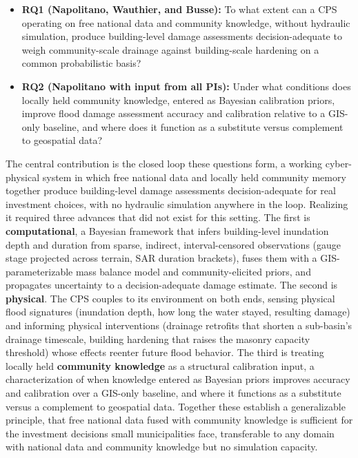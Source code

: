 \documentclass[11pt]{article}
\begin{document}
\begin{itemize}[leftmargin=1.5em,itemsep=0pt]
\item \textbf{RQ1 (Napolitano, Wauthier, and Busse):} To what extent can a CPS
operating on free national data and community knowledge, without hydraulic
simulation, produce building-level damage assessments decision-adequate to weigh
community-scale drainage against building-scale hardening on a common probabilistic
basis?
\item \textbf{RQ2 (Napolitano with input from all PIs):} Under what conditions does locally
held community knowledge, entered as Bayesian calibration priors, improve flood
damage assessment accuracy and calibration relative to a GIS-only baseline, and
where does it function as a substitute versus complement to geospatial data?
\end{itemize}

The central contribution is the closed loop these questions form, a working
cyber-physical system in which free national data and locally held community memory
together produce building-level damage assessments decision-adequate for real
investment choices, with no hydraulic simulation anywhere in the loop. Realizing it
required three advances that did not exist for this setting. The first is
\textbf{computational}, a Bayesian framework that infers building-level inundation
depth and duration from sparse, indirect, interval-censored observations (gauge stage
projected across terrain, SAR duration brackets), fuses them with a
GIS-parameterizable mass balance model and community-elicited priors, and propagates
uncertainty to a decision-adequate damage estimate. The second is \textbf{physical}. The CPS couples to its environment on both ends, sensing physical flood signatures
(inundation depth, how long the water stayed, resulting damage) and informing physical
interventions (drainage retrofits that shorten a sub-basin's drainage timescale,
building hardening that raises the masonry capacity threshold) whose effects reenter
future flood behavior. The third is treating locally held \textbf{community knowledge}
as a structural calibration input, a characterization of when knowledge entered as
Bayesian priors improves accuracy and calibration over a GIS-only baseline, and where
it functions as a substitute versus a complement to geospatial data. Together these
establish a generalizable principle, that free national data fused with community
knowledge is sufficient for the investment decisions small municipalities face,
transferable to any domain with national data and community knowledge but no
simulation capacity.
\end{document}
